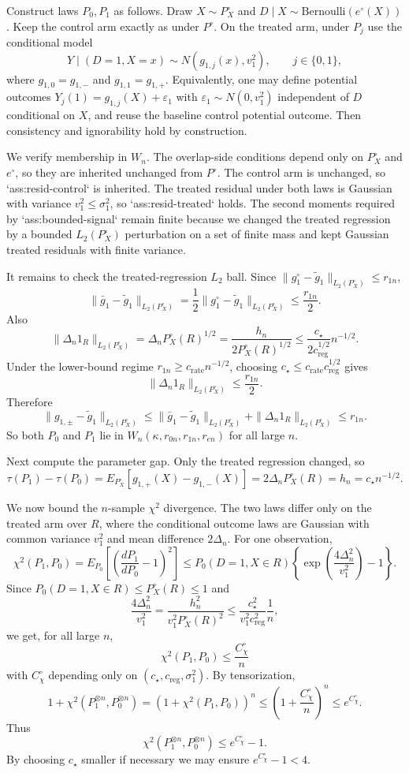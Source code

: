\documentclass{article}
\begin{document}
Construct laws $P_0,P_1$ as follows. Draw $X\sim P_X^\circ$ and
$D\mid X\sim\mathrm{Bernoulli}(e^\circ(X))$. Keep the control arm exactly as under $P^\circ$.
On the treated arm, under $P_j$ use the conditional model
\[
Y\mid(D=1,X=x)\sim N(g_{1,j}(x),v_1^2),\qquad j\in\{0,1\},
\]
where $g_{1,0}=g_{1,-}$ and $g_{1,1}=g_{1,+}$. Equivalently, one may define potential
outcomes $Y_j(1)=g_{1,j}(X)+\varepsilon_1$ with
$\varepsilon_1\sim N(0,v_1^2)$ independent of $D$ conditional on $X$, and reuse the baseline
control potential outcome. Then consistency and ignorability hold by construction.

We verify membership in $W_n$. The overlap-side conditions depend only on $P_X^\circ$ and
$e^\circ$, so they are inherited unchanged from $P^\circ$. The control arm is unchanged, so
`ass:resid-control` is inherited. The treated residual under both laws is Gaussian with variance
$v_1^2\le \sigma_1^2$, so `ass:resid-treated` holds. The second moments required by
`ass:bounded-signal` remain finite because we changed the treated regression by a bounded
$L_2(P_X^\circ)$ perturbation on a set of finite mass and kept Gaussian treated residuals with
finite variance.

It remains to check the treated-regression $L_2$ ball. Since
$\|g_1^\circ-\tilde g_1\|_{L_2(P_X^\circ)}\le r_{1n}$,
\[
\|\bar g_1-\tilde g_1\|_{L_2(P_X^\circ)}
=\frac12\|g_1^\circ-\tilde g_1\|_{L_2(P_X^\circ)}\le \frac{r_{1n}}2.
\]
Also
\[
\|\Delta_n1_R\|_{L_2(P_X^\circ)}
=\Delta_n P_X^\circ(R)^{1/2}
=\frac{h_n}{2P_X^\circ(R)^{1/2}}
\le \frac{c_\star}{2c_{\mathrm{reg}}^{1/2}}n^{-1/2}.
\]
Under the lower-bound regime $r_{1n}\ge c_{\mathrm{rate}}n^{-1/2}$, choosing
$c_\star\le c_{\mathrm{rate}}c_{\mathrm{reg}}^{1/2}$ gives
\[
\|\Delta_n1_R\|_{L_2(P_X^\circ)}\le \frac{r_{1n}}2.
\]
Therefore
\[
\|g_{1,\pm}-\tilde g_1\|_{L_2(P_X^\circ)}
\le \|\bar g_1-\tilde g_1\|_{L_2(P_X^\circ)}+\|\Delta_n1_R\|_{L_2(P_X^\circ)}
\le r_{1n}.
\]
So both $P_0$ and $P_1$ lie in $W_n(\kappa,r_{0n},r_{1n},r_{en})$ for all large $n$.

Next compute the parameter gap. Only the treated regression changed, so
\[
\tau(P_1)-\tau(P_0)
=E_{P_X^\circ}[g_{1,+}(X)-g_{1,-}(X)]
=2\Delta_n P_X^\circ(R)=h_n=c_\star n^{-1/2}.
\]

We now bound the $n$-sample $\chi^2$ divergence. The two laws differ only on the treated arm
over $R$, where the conditional outcome laws are Gaussian with common variance $v_1^2$ and mean
difference $2\Delta_n$. For one observation,
\[
\chi^2(P_1,P_0)
=E_{P_0}\!\left[\left(\frac{dP_1}{dP_0}-1\right)^2\right]
\le P_0(D=1,X\in R)\left\{\exp\!\left(\frac{4\Delta_n^2}{v_1^2}\right)-1\right\}.
\]
Since $P_0(D=1,X\in R)\le P_X^\circ(R)\le 1$ and
\[
\frac{4\Delta_n^2}{v_1^2}
=\frac{h_n^2}{v_1^2P_X^\circ(R)^2}
\le \frac{c_\star^2}{v_1^2c_{\mathrm{reg}}^2}\frac1n,
\]
we get, for all large $n$,
\[
\chi^2(P_1,P_0)\le \frac{C_\chi^\circ}{n}
\]
with $C_\chi^\circ$ depending only on $(c_\star,c_{\mathrm{reg}},\sigma_1^2)$. By
tensorization,
\[
1+\chi^2(P_1^{\otimes n},P_0^{\otimes n})
=(1+\chi^2(P_1,P_0))^n
\le \left(1+\frac{C_\chi^\circ}{n}\right)^n
\le e^{C_\chi^\circ}.
\]
Thus
\[
\chi^2(P_1^{\otimes n},P_0^{\otimes n})\le e^{C_\chi^\circ}-1.
\]
By choosing $c_\star$ smaller if necessary we may ensure $e^{C_\chi^\circ}-1<4$.
\end{document}
